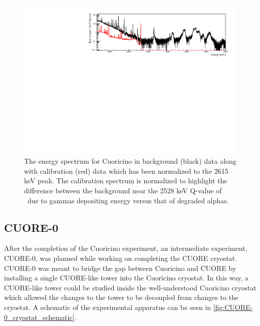 \begin{figure}[htbp]
    \centering
    \includegraphics[width=0.8\linewidth]{Figures/CuoricinoSpectrum.pdf}
    \caption[The energy spectrum for Cuoricino in background and calibration data which has been normalized to the 2615 keV peak]
    {The energy spectrum for Cuoricino in background (black) data along with calibration (red) data which has been normalized to the 2615 keV peak.
    The calibration spectrum is normalized to highlight the difference between the background near the 2528 keV Q-value of \zeronubb~due to gammas depositing energy versus that of degraded alphas.}
    \label{fig:cuoricino spectrum}
\end{figure}

\subsection{CUORE-0}
\label{ssec:CUORE-0}

After the completion of the Cuoricino experiment, an intermediate experiment, CUORE-0, was planned while working on completing the CUORE cryostat.
CUORE-0 was meant to bridge the gap between Cuoricino and CUORE by installing a single CUORE-like tower into the Cuoricino cryostat.
In this way, a CUORE-like tower could be studied inside the well-understood Cuoricino cryostat which allowed the changes to the tower to be decoupled from changes to the cryostat.
A schematic of the experimental apparatus can be seen in \autoref{fig:CUORE-0_cryostat_schematic}.

